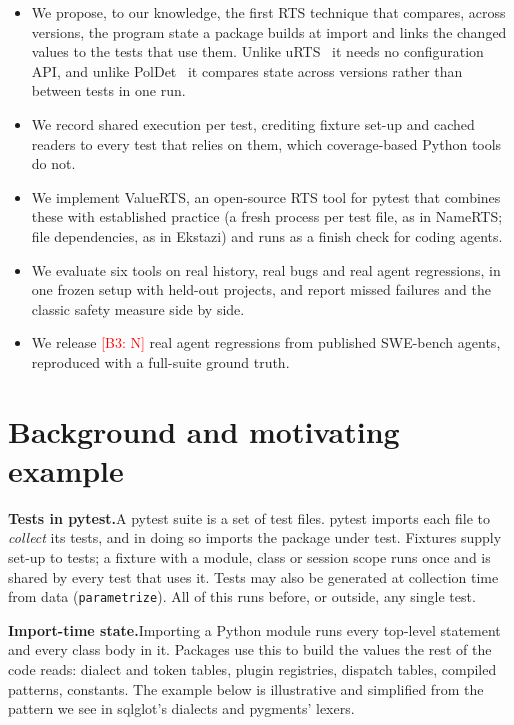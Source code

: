 \documentclass[acmsmall,screen,review,anonymous]{acmart}
\newcommand{\ph}[1]{\textcolor{red}{[#1]}}
\newcommand{\tool}{ValueRTS\xspace}
\newcommand{\para}[1]{\smallskip\noindent\textbf{#1}\hspace{0.4em}}
\begin{document}
\begin{itemize}
  \item We propose, to our knowledge, the first RTS technique that compares, across versions, the program state a package builds at import and links the changed values to the tests that use them. Unlike uRTS~\cite{wang2023urts} it needs no configuration API, and unlike PolDet~\cite{gyori2015poldet} it compares state across versions rather than between tests in one run.
  \item We record shared execution per test, crediting fixture set-up and cached readers to every test that relies on them, which coverage-based Python tools do not.
  \item We implement \tool, an open-source RTS tool for pytest that combines these with established practice (a fresh process per test file, as in NameRTS; file dependencies, as in Ekstazi) and runs as a finish check for coding agents.
  \item We evaluate six tools on real history, real bugs and real agent regressions, in one frozen setup with held-out projects, and report missed failures and the classic safety measure side by side.
  \item We release \ph{B3: N} real agent regressions from published SWE-bench agents, reproduced with a full-suite ground truth.
\end{itemize}


\section{Background and motivating example}\label{sec:background-and-motivating-example}
\para{Tests in pytest.}A pytest suite is a set of test files. pytest imports each file to \emph{collect} its tests, and in doing so imports the package under test. Fixtures supply set-up to tests; a fixture with a module, class or session scope runs once and is shared by every test that uses it. Tests may also be generated at collection time from data (\texttt{parametrize}). All of this runs before, or outside, any single test.

\para{Import-time state.}Importing a Python module runs every top-level statement and every class body in it. Packages use this to build the values the rest of the code reads: dialect and token tables, plugin registries, dispatch tables, compiled patterns, constants. The example below is illustrative and simplified from the pattern we see in sqlglot's dialects and pygments' lexers.
\end{document}

